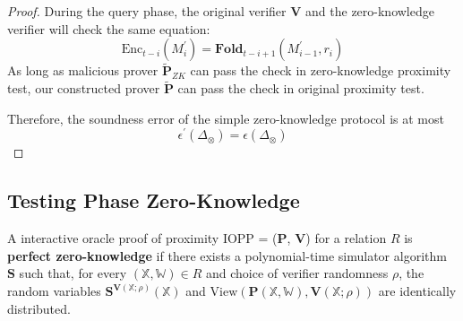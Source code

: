 \begin{proof}
During the query phase, the original verifier \textbf{V} and the zero-knowledge verifier will check the same equation:
$$
    \text{Enc}_{t-i}(M_i^\prime) = \textbf{Fold}_{t-i+1}(M_{i-1}^\prime, r_i)
$$
As long as malicious prover $\tilde{\textbf{P}}_{ZK}$ can pass the check in zero-knowledge proximity test, our constructed prover $\tilde{\textbf{P}}$ can pass the check in original proximity test.

Therefore, the soundness error of the simple zero-knowledge protocol is at most
$$
    \epsilon^\prime(\Delta_\otimes) = \epsilon(\Delta_\otimes) 
$$

\end{proof}


\subsection{Testing Phase Zero-Knowledge}

\begin{definition}

A interactive oracle proof of proximity IOPP = ($\textbf{P}$, $\textbf{V}$) for a relation $R$ is \textbf{perfect zero-knowledge} if there exists a polynomial-time simulator algorithm $\textbf{S}$ such that, for every $(\mathbb{X}, \mathbb{W}) \in R$ and choice of verifier randomness $\rho$, the random variables $\textbf{S}^{\textbf{V}(\mathbb{X};\rho)}(\mathbb{X})$ and $\text{View}(\textbf{P}(\mathbb{X}, \mathbb{W}), \textbf{V}(\mathbb{X};\rho))$ are identically distributed.
 
\end{definition}

